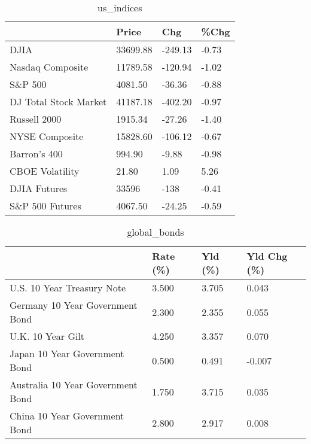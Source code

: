 \documentclass{article}%
\begin{document}
%


\begin{table}[htbp]%
\caption{us\_indices}%
\centering%
\begin{adjustbox}{width=1\textwidth}%
\begin{tabular}{llll}
\toprule
                      &    Price &     Chg &  \%Chg \\
\midrule
                 DJIA & 33699.88 & -249.13 & -0.73 \\
     Nasdaq Composite & 11789.58 & -120.94 & -1.02 \\
              S\&P 500 &  4081.50 &  -36.36 & -0.88 \\
DJ Total Stock Market & 41187.18 & -402.20 & -0.97 \\
         Russell 2000 &  1915.34 &  -27.26 & -1.40 \\
       NYSE Composite & 15828.60 & -106.12 & -0.67 \\
         Barron's 400 &   994.90 &   -9.88 & -0.98 \\
      CBOE Volatility &    21.80 &    1.09 &  5.26 \\
         DJIA Futures &    33596 &    -138 & -0.41 \\
      S\&P 500 Futures &  4067.50 &  -24.25 & -0.59 \\
\bottomrule
\end{tabular}
%
\end{adjustbox}%
\end{table}

%


\begin{table}[htbp]%
\caption{global\_bonds}%
\centering%
\begin{adjustbox}{width=1\textwidth}%
\begin{tabular}{llll}
\toprule
                                  & Rate (\%) & Yld (\%) & Yld Chg (\%) \\
\midrule
       U.S. 10 Year Treasury Note &    3.500 &   3.705 &       0.043 \\
  Germany 10 Year Government Bond &    2.300 &   2.355 &       0.055 \\
                U.K. 10 Year Gilt &    4.250 &   3.357 &       0.070 \\
    Japan 10 Year Government Bond &    0.500 &   0.491 &      -0.007 \\
Australia 10 Year Government Bond &    1.750 &   3.715 &       0.035 \\
    China 10 Year Government Bond &    2.800 &   2.917 &       0.008 \\
\bottomrule
\end{tabular}
%
\end{adjustbox}%
\end{table}
\end{document}
